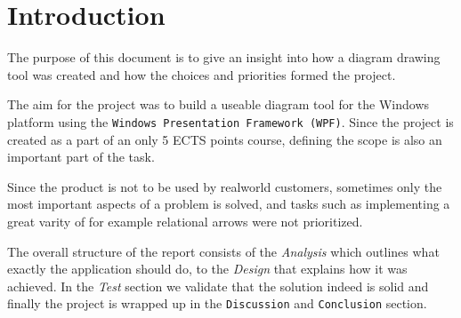 \section{Introduction}
The purpose of this document is to give an insight into how a diagram drawing
tool was created and how the choices and priorities formed the project. 

The aim for the project was to build a useable diagram tool for the Windows
platform using the \texttt{Windows Presentation Framework (WPF)}. Since the project is
created as a part of an only 5 ECTS points course, defining the scope is also an
important part of the task.

Since the product is not to be used by realworld customers, sometimes only the
most important aspects of a problem is solved, and tasks such as implementing a great varity of for
example relational arrows were not prioritized.

The overall structure of the report consists of the
\textit{Analysis} which outlines what exactly the application should do, to the
\textit{Design} that explains how it was achieved. In the \textit{Test} section
we validate that the solution indeed is solid and finally the project is wrapped
up in the \texttt{Discussion} and \texttt{Conclusion} section.
